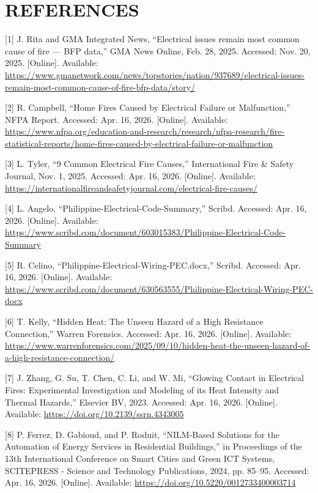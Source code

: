 ﻿\chapter*{REFERENCES}
\begin{thesisreferences}

{[}1{]} J. Rita and GMA Integrated News, ``Electrical issues remain most common
cause of fire --- BFP data,'' GMA News Online, Feb. 28, 2025. Accessed:
Nov. 20, 2025. {[}Online{]}. Available:
\url{https://www.gmanetwork.com/news/topstories/nation/937689/electrical-issues-remain-most-common-cause-of-fire-bfp-data/story/}

{[}2{]} R. Campbell, ``Home Fires Caused by Electrical Failure or
Malfunction,'' NFPA Report. Accessed: Apr. 16, 2026. {[}Online{]}.
Available:
\url{https://www.nfpa.org/education-and-research/research/nfpa-research/fire-statistical-reports/home-fires-caused-by-electrical-failure-or-malfunction}

{[}3{]} L. Tyler, ``9 Common Electrical Fire Causes,'' International
Fire \& Safety Journal, Nov. 1, 2025. Accessed: Apr. 16, 2026.
{[}Online{]}. Available:
\url{https://internationalfireandsafetyjournal.com/electrical-fire-causes/}

{[}4{]} L. Angelo, ``Philippine-Electrical-Code-Summary,'' Scribd.
Accessed: Apr. 16, 2026. {[}Online{]}. Available:
\url{https://www.scribd.com/document/603015383/Philippine-Electrical-Code-Summary}

{[}5{]} R. Celino, ``Philippine-Electrical-Wiring-PEC.docx,'' Scribd.
Accessed: Apr. 16, 2026. {[}Online{]}. Available:
\url{https://www.scribd.com/document/630563555/Philippine-Electrical-Wiring-PEC-docx}

{[}6{]} T. Kelly, ``Hidden Heat: The Unseen Hazard of a High Resistance
Connection,'' Warren Forensics. Accessed: Apr. 16, 2026. {[}Online{]}.
Available:
\url{https://www.warrenforensics.com/2025/09/10/hidden-heat-the-unseen-hazard-of-a-high-resistance-connection/}

{[}7{]} J. Zhang, G. Su, T. Chen, C. Li, and W. Mi, ``Glowing Contact in
Electrical Fires: Experimental Investigation and Modeling of its Heat
Intensity and Thermal Hazards,'' Elsevier BV, 2023. Accessed: Apr. 16,
2026. {[}Online{]}. Available:
\url{https://doi.org/10.2139/ssrn.4343005}

{[}8{]} P. Ferrez, D. Gabioud, and P. Roduit, ``NILM-Based Solutions for
the Automation of Energy Services in Residential Buildings,'' in
Proceedings of the 13th International Conference on Smart Cities and
Green ICT Systems, SCITEPRESS - Science and Technology Publications,
2024, pp. 85--95. Accessed: Apr. 16, 2026. {[}Online{]}. Available:
\url{https://doi.org/10.5220/0012733400003714}


\end{thesisreferences}
